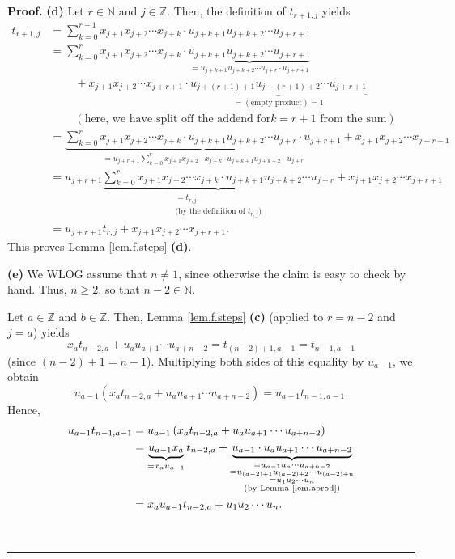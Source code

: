 \documentclass[numbers=enddot,12pt,final,onecolumn,notitlepage]{scrartcl}%
\theoremstyle{definition}
\newenvironment{proof}[1][Proof]{\noindent\textbf{#1.} }{\ \rule{0.5em}{0.5em}}
\let\sumnonlimits\sum
\renewcommand{\sum}{\sumnonlimits\limits}
\begin{document}
\begin{proof}
\textbf{(d)} Let $r\in\mathbb{N}$ and $j\in\mathbb{Z}$. Then, the definition
of $t_{r+1,j}$ yields%
\begin{align*}
t_{r+1,j}  &  =\sum_{k=0}^{r+1}x_{j+1}x_{j+2}\cdots x_{j+k}\cdot
u_{j+k+1}u_{j+k+2}\cdots u_{j+r+1}\\
&  =\sum_{k=0}^{r}x_{j+1}x_{j+2}\cdots x_{j+k}\cdot\underbrace{u_{j+k+1}%
u_{j+k+2}\cdots u_{j+r+1}}_{=u_{j+k+1}u_{j+k+2}\cdots u_{j+r}\cdot u_{j+r+1}%
}\\
&  \ \ \ \ \ \ \ \ \ \ +x_{j+1}x_{j+2}\cdots x_{j+r+1}\cdot
\underbrace{u_{j+\left(  r+1\right)  +1}u_{j+\left(  r+1\right)  +2}\cdots
u_{j+r+1}}_{=\left(  \text{empty product}\right)  =1}\\
&  \ \ \ \ \ \ \ \ \ \ \left(  \text{here, we have split off the addend for
}k=r+1\text{ from the sum}\right) \\
&  =\underbrace{\sum_{k=0}^{r}x_{j+1}x_{j+2}\cdots x_{j+k}\cdot u_{j+k+1}%
u_{j+k+2}\cdots u_{j+r}\cdot u_{j+r+1}}_{=u_{j+r+1}\sum_{k=0}^{r}%
x_{j+1}x_{j+2}\cdots x_{j+k}\cdot u_{j+k+1}u_{j+k+2}\cdots u_{j+r}}%
+x_{j+1}x_{j+2}\cdots x_{j+r+1}\\
&  =u_{j+r+1}\underbrace{\sum_{k=0}^{r}x_{j+1}x_{j+2}\cdots x_{j+k}\cdot
u_{j+k+1}u_{j+k+2}\cdots u_{j+r}}_{\substack{=t_{r,j}\\\text{(by the
definition of }t_{r,j}\text{)}}}+x_{j+1}x_{j+2}\cdots x_{j+r+1}\\
&  =u_{j+r+1}t_{r,j}+x_{j+1}x_{j+2}\cdots x_{j+r+1}.
\end{align*}
This proves Lemma \ref{lem.f.steps} \textbf{(d)}.

\textbf{(e)} We WLOG assume that $n\neq1$, since otherwise the claim is easy
to check by hand. Thus, $n\geq2$, so that $n-2\in\mathbb{N}$.

Let $a\in\mathbb{Z}$ and $b\in\mathbb{Z}$. Then, Lemma \ref{lem.f.steps}
\textbf{(c)} (applied to $r=n-2$ and $j=a$) yields%
\[
x_{a}t_{n-2,a}+u_{a}u_{a+1}\cdots u_{a+n-2}=t_{\left(  n-2\right)
+1,a-1}=t_{n-1,a-1}%
\]
(since $\left(  n-2\right)  +1=n-1$). Multiplying both sides of this equality
by $u_{a-1}$, we obtain%
\[
u_{a-1}\left(  x_{a}t_{n-2,a}+u_{a}u_{a+1}\cdots u_{a+n-2}\right)
=u_{a-1}t_{n-1,a-1}.
\]
Hence,%
\begin{align}
u_{a-1}t_{n-1,a-1}  &  =u_{a-1}\left(  x_{a}t_{n-2,a}+u_{a}u_{a+1}\cdots
u_{a+n-2}\right) \nonumber\\
&  =\underbrace{u_{a-1}x_{a}}_{=x_{a}u_{a-1}}t_{n-2,a}+\underbrace{u_{a-1}%
\cdot u_{a}u_{a+1}\cdots u_{a+n-2}}_{\substack{=u_{a-1}u_{a}\cdots
u_{a+n-2}\\=u_{\left(  a-2\right)  +1}u_{\left(  a-2\right)  +2}\cdots
u_{\left(  a-2\right)  +n}\\=u_{1}u_{2}\cdots u_{n}\\\text{(by Lemma
\ref{lem.aprod})}}}\nonumber\\
&  =x_{a}u_{a-1}t_{n-2,a}+u_{1}u_{2}\cdots u_{n}. \label{pf.lem.f.steps.e.1}%
\end{align}



\end{proof}
\end{document}
